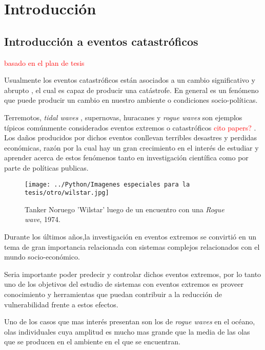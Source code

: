 \chapter{Introducción}
	
	\section{Introducción a eventos catastróficos}
	
		\textcolor{red}{basado en el plan de tesis}
		
		Usualmente los eventos catastróficos están asociados a un cambio significativo y abrupto , el cual es capaz de producir una catástrofe.
		En general es un fenómeno que puede producir un cambio en nuestro ambiente o condiciones socio-políticas. 
		
		Terremotos, \textit{tidal waves} , supernovas, huracanes y \textit{rogue waves} son ejemplos típicos comúnmente considerados eventos extremos o catastróficos \textcolor{red}{cito papers? }.
		Los daños producidos por  dichos eventos conllevan terribles desastres y perdidas económicas, razón por la cual hay un  gran crecimiento en el interés de estudiar y aprender acerca de  estos fenómenos tanto en investigación científica como por parte de políticas publicas.
		
		\begin{figure}[htp]
			\begin{center}
				\texttt{[image: ../Python/Imagenes especiales para la tesis/otro/wilstar.jpg]}
				\caption{Tanker Noruego 'Wilstar' luego de un encuentro con una \textit{Rogue wave}, 1974.}%
				\label{fig: wilstar}
			\end{center}
		\end{figure}
		
		Durante los últimos años,la investigación en eventos extremos se convirtió en un tema de gran importancia relacionada con sistemas complejos relacionados con el mundo socio-económico.
		
		Seria importante poder predecir y controlar dichos eventos extremos, por lo tanto uno de los objetivos del estudio de sistemas con eventos extremos es proveer conocimiento y herramientas que puedan contribuir a la reducción de vulnerabilidad frente a estos efectos.
		
		\label{rogue waves}
		Uno de los casos que mas interés presentan son los de \textit{rogue waves} en el océano, olas individuales cuya amplitud es mucho mas grande que la media de las olas que se producen en el ambiente en el que se encuentran. 
		
